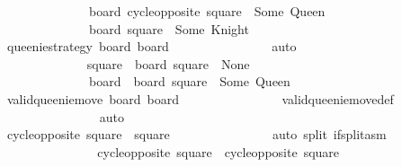 \begin{isabellebody}
\ \ \ \ \ \ \ \ \ \ \ \ \ \ {\isachardoublequoteopen}board{\isacharprime}{\isacharprime}\ {\isacharparenleft}cycle{\isacharunderscore}opposite\ square{\isacharprime}{\isacharparenright}\ {\isacharequal}\ Some\ Queen{\isachardoublequoteclose}\isanewline
\ \ \ \ \ \ \ \ \ \ \ \ \ \ {\isachardoublequoteopen}board{\isacharprime}\ square{\isacharprime}\ {\isacharequal}\ Some\ Knight{\isachardoublequoteclose}\isanewline
\ \ \ \ \ \ \ \ \ \ \ \ \ \ \isamarkupfalse%
\ {\isacharbackquoteopen}{\isacharquery}queenie{\isacharunderscore}strategy\ board{\isacharprime}\ board{\isacharprime}{\isacharprime}{\isacharbackquoteclose}\isanewline
\ \ \ \ \ \ \ \ \ \ \ \ \ \ \isamarkupfalse%
\ auto\isanewline
\ \ \ \ \ \ \ \ \ \ \ \ \isamarkupfalse%
\isanewline
\ \ \ \ \ \ \ \ \ \ \ \ \isamarkupfalse%
\ square{\isacharprime}{\isacharprime}\ \ {\isachardoublequoteopen}board{\isacharprime}\ square{\isacharprime}{\isacharprime}\ {\isacharequal}\ None{\isachardoublequoteclose}\ \isanewline
\ \ \ \ \ \ \ \ \ \ \ \ \ \ {\isachardoublequoteopen}board{\isacharprime}{\isacharprime}\ {\isacharequal}\ board{\isacharprime}\ {\isacharparenleft}square{\isacharprime}{\isacharprime}\ {\isacharcolon}{\isacharequal}\ Some\ Queen{\isacharparenright}{\isachardoublequoteclose}\isanewline
\ \ \ \ \ \ \ \ \ \ \ \ \ \ \isamarkupfalse%
\ {\isacharbackquoteopen}valid{\isacharunderscore}queenie{\isacharunderscore}move\ board{\isacharprime}\ board{\isacharprime}{\isacharprime}{\isacharbackquoteclose}\isanewline
\ \ \ \ \ \ \ \ \ \ \ \ \ \ \isamarkupfalse%
\ valid{\isacharunderscore}queenie{\isacharunderscore}move{\isacharunderscore}def\isanewline
\ \ \ \ \ \ \ \ \ \ \ \ \ \ \isamarkupfalse%
\ auto\isanewline
\ \ \ \ \ \ \ \ \ \ \ \ \isamarkupfalse%
\isanewline
\ \ \ \ \ \ \ \ \ \ \ \ \isamarkupfalse%
\ {\isachardoublequoteopen}cycle{\isacharunderscore}opposite\ square{\isacharprime}\ {\isacharequal}\ square{\isacharprime}{\isacharprime}{\isachardoublequoteclose}\isanewline
\ \ \ \ \ \ \ \ \ \ \ \ \ \ \isamarkupfalse%
\ {\isacharparenleft}auto\ split{\isacharcolon}\ if{\isacharunderscore}split{\isacharunderscore}asm{\isacharparenright}\isanewline
\ \ \ \ \ \ \ \ \ \ \ \ \isamarkupfalse%
\ \isamarkupfalse%
\ {\isachardoublequoteopen}cycle{\isacharunderscore}opposite\ square{\isacharprime}\ {\isacharequal}\ cycle{\isacharunderscore}opposite\ square{\isachardoublequoteclose}\isanewline

\end{isabellebody}
